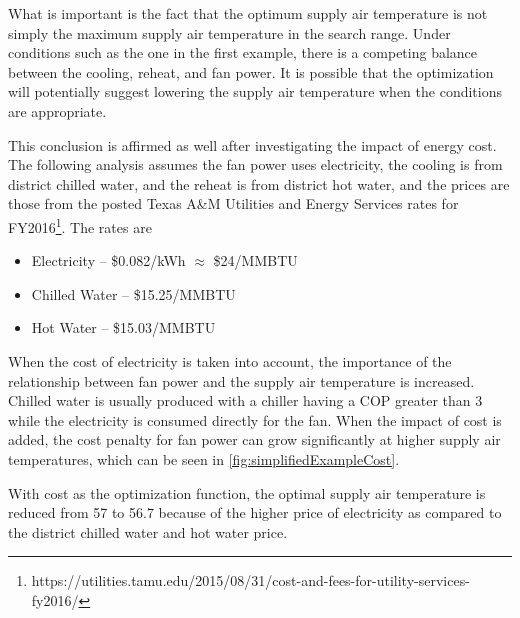 What is important is the fact that the optimum supply air temperature is
not simply the maximum supply air temperature in the search range. Under
conditions such as the one in the first example, there is a competing
balance between the cooling, reheat, and fan power. It is possible that
the optimization will potentially suggest lowering the supply air
temperature when the conditions are appropriate.

This conclusion is affirmed as well after investigating the impact of
energy cost. The following analysis assumes the fan power uses 
electricity, the cooling is from district chilled water, and the reheat
is from district hot water, and the prices are those from the posted
Texas A\&M Utilities and Energy Services rates for
FY2016\footnote{https://utilities.tamu.edu/2015/08/31/cost-and-fees-for-utility-services-fy2016/}.
The rates are 

\begin{itemize}
    \item Electricity -- \$0.082/kWh \(\approx\) \$24/MMBTU
    \item Chilled Water -- \$15.25/MMBTU
    \item Hot Water -- \$15.03/MMBTU
\end{itemize}

When the cost of electricity is taken into account, the importance of
the relationship between fan power and the supply air temperature is
increased. Chilled water is usually produced with a chiller having a COP
greater than 3 while the electricity is consumed directly for the fan.
When the impact of cost is added, the cost penalty for fan power can grow
significantly at higher supply air temperatures, which can be seen in
\figref{} \ref{fig:simplifiedExampleCost}. 

With cost as the optimization function, the optimal supply air
temperature is reduced from \SI{57}{\degF} to \SI{56.7}{\degF} because
of the higher price of electricity as compared to the district chilled
water and hot water price. 

